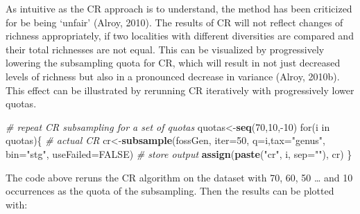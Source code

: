 \documentclass[]{article}
\newenvironment{Shaded}{\begin{snugshade}}{\end{snugshade}}
\newcommand{\KeywordTok}[1]{\textcolor[rgb]{0.13,0.29,0.53}{\textbf{{#1}}}}
\newcommand{\DataTypeTok}[1]{\textcolor[rgb]{0.13,0.29,0.53}{{#1}}}
\newcommand{\DecValTok}[1]{\textcolor[rgb]{0.00,0.00,0.81}{{#1}}}
\newcommand{\StringTok}[1]{\textcolor[rgb]{0.31,0.60,0.02}{{#1}}}
\newcommand{\CommentTok}[1]{\textcolor[rgb]{0.56,0.35,0.01}{\textit{{#1}}}}
\newcommand{\OtherTok}[1]{\textcolor[rgb]{0.56,0.35,0.01}{{#1}}}
\newcommand{\NormalTok}[1]{{#1}}
\begin{document}
As intuitive as the CR approach is to understand, the method has been
criticized for be being `unfair' (Alroy, 2010). The results of CR will
not reflect changes of richness appropriately, if two localities with
different diversities are compared and their total richnesses are not
equal. This can be visualized by progressively lowering the subsampling
quota for CR, which will result in not just decreased levels of richness
but also in a pronounced decrease in variance (Alroy, 2010b). This
effect can be illustrated by rerunning CR iteratively with progressively
lower quotas.

\begin{Shaded}
\begin{Highlighting}[]
\CommentTok{# repeat CR subsampling for a set of quotas}
\NormalTok{quotas<-}\KeywordTok{seq}\NormalTok{(}\DecValTok{70}\NormalTok{,}\DecValTok{10}\NormalTok{,-}\DecValTok{10}\NormalTok{)}
\NormalTok{for(i in quotas)\{}
   \CommentTok{# actual CR }
   \NormalTok{cr<-}\KeywordTok{subsample}\NormalTok{(fossGen, }\DataTypeTok{iter=}\DecValTok{50}\NormalTok{, }\DataTypeTok{q=}\NormalTok{i,}\DataTypeTok{tax=}\StringTok{"genus"}\NormalTok{, }\DataTypeTok{bin=}\StringTok{"stg"}\NormalTok{, }
    \DataTypeTok{useFailed=}\OtherTok{FALSE}\NormalTok{)}
  \CommentTok{# store output}
  \KeywordTok{assign}\NormalTok{(}\KeywordTok{paste}\NormalTok{(}\StringTok{"cr"}\NormalTok{, i, }\DataTypeTok{sep=}\StringTok{""}\NormalTok{), cr)}
\NormalTok{\}}
\end{Highlighting}
\end{Shaded}

The code above reruns the CR algorithm on the dataset with 70, 60, 50
\ldots{} and 10 occurrences as the quota of the subsampling. Then the
results can be plotted with:

\begin{Shaded}
\end{Shaded}
\end{document}
